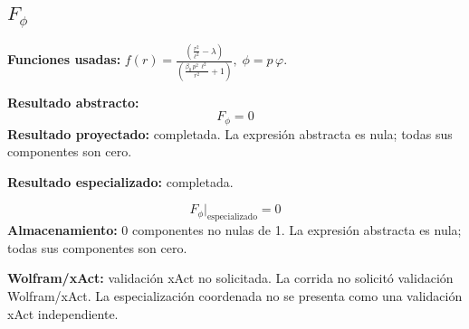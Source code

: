 \documentclass[11pt]{article}
\begin{document}
\subsection*{$ F_{\phi} $}
\textbf{Funciones usadas:} $ f\!\left(r\right) = \frac{\left(\frac{{r}^{2}}{{\ell}^{2}} - \lambda\right)}{\left(\frac{\beta_{0}\,{p}^{2}\,{\ell}^{2}}{{r}^{2}} + 1\right)},\;\phi=p\,\varphi $.\par
\textbf{Resultado abstracto:}
\begin{dmath*}[breakdepth={5}]
F_{\phi} = 0
\end{dmath*}
\textbf{Resultado proyectado:} completada. La expresión abstracta es nula; todas sus componentes son cero.\par
\textbf{Resultado especializado:} completada.\par
\begin{dmath*}[breakdepth={5}]
F_{\phi}\big|_{\mathrm{especializado}} = 0
\end{dmath*}
\textbf{Almacenamiento:} 0 componentes no nulas de 1. La expresión abstracta es nula; todas sus componentes son cero.\par
\textbf{Wolfram/xAct:} validación xAct no solicitada. La corrida no solicitó validación Wolfram/xAct. La especialización coordenada no se presenta como una validación xAct independiente.\par\medskip
{}
\end{document}

